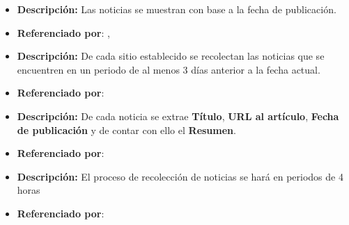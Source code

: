 
\begin{itemize}
  \item \textbf{Descripción:} Las noticias se muestran con base a la fecha de publicación.
  \item \textbf{Referenciado por}: , \\
\end{itemize}


\begin{itemize}
  \item \textbf{Descripción:} De cada sitio establecido se recolectan las noticias que se encuentren en un periodo de al menos 3 días anterior a la fecha actual.
  \item \textbf{Referenciado por}:  \\
\end{itemize}


\begin{itemize}
  \item \textbf{Descripción:} De cada noticia se extrae \textbf{Título}, \textbf{URL al artículo}, \textbf{Fecha de publicación} y de contar con ello el \textbf{Resumen}.

  \item \textbf{Referenciado por}: \\
\end{itemize}



\begin{itemize}
  \item \textbf{Descripción:} El proceso de recolección de noticias se hará en periodos de 4 horas 

  \item \textbf{Referenciado por}: \\
\end{itemize}
